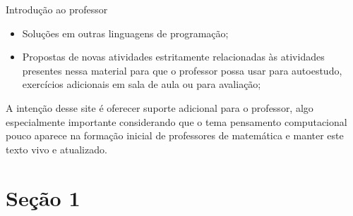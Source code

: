 \begin{apresentacao}{Introdução ao professor}
\begin{itemize}
\item Soluções em outras linguagens de programação;

\item Propostas de novas atividades estritamente relacionadas às atividades presentes nessa material para que o professor possa usar para autoestudo, exercícios adicionais em sala de aula ou para avaliação;

\end{itemize}

A intenção desse site é oferecer suporte adicional para o professor, algo especialmente importante considerando que o tema pensamento computacional pouco aparece na formação inicial de professores de matemática e manter este texto vivo e atualizado.

\end{apresentacao}

\def\currentcolor{session1}
\section{Seção 1}

